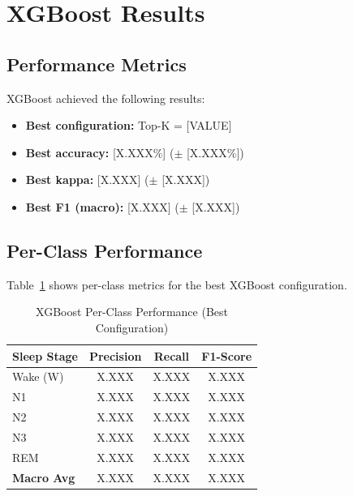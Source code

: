 
\section{XGBoost Results}
\label{sec:xgboost_results}

\subsection{Performance Metrics}
\label{subsec:xgboost_metrics}


XGBoost achieved the following results:

\begin{itemize}
    \item \textbf{Best configuration:} Top-K = [VALUE]
    \item \textbf{Best accuracy:} [X.XXX\%] ($\pm$ [X.XXX\%])
    \item \textbf{Best kappa:} [X.XXX] ($\pm$ [X.XXX])
    \item \textbf{Best F1 (macro):} [X.XXX] ($\pm$ [X.XXX])
\end{itemize}

\subsection{Per-Class Performance}
\label{subsec:xgboost_perclass}

Table~\ref{tab:xgboost_perclass} shows per-class metrics for the best XGBoost configuration.

\begin{table}[htbp]
    \centering
    \caption{XGBoost Per-Class Performance (Best Configuration)}
    \label{tab:xgboost_perclass}
    \begin{tabular}{lccc}
        \toprule
        \textbf{Sleep Stage} & \textbf{Precision} & \textbf{Recall} & \textbf{F1-Score} \\
        \midrule
        Wake (W) & X.XXX & X.XXX & X.XXX \\
        N1 & X.XXX & X.XXX & X.XXX \\
        N2 & X.XXX & X.XXX & X.XXX \\
        N3 & X.XXX & X.XXX & X.XXX \\
        REM & X.XXX & X.XXX & X.XXX \\
        \midrule
        \textbf{Macro Avg} & X.XXX & X.XXX & X.XXX \\
        \bottomrule
    \end{tabular}
\end{table}

